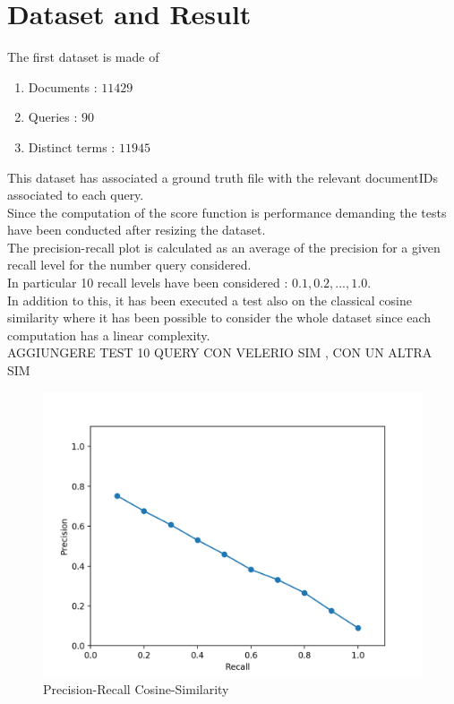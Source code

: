 \documentclass[twoside]{article}
\begin{document}
\section{Dataset and Result}
The first dataset is made of
\begin{enumerate}
\item Documents : $11429$
\item Queries : $90$
\item Distinct terms : $11945$
\end{enumerate}
This dataset has associated a ground truth file with the relevant documentIDs associated to each query.\\Since the computation of the score function is performance demanding the tests have been conducted after resizing the dataset.\\The precision-recall plot is calculated as an average of the precision for a given recall level for the number  query considered.\\In particular 10 recall levels have been considered : $ 0.1, 0.2, ... , 1.0 $.\\In addition to this, it has been executed a test also on the classical cosine similarity where it has been possible to consider the whole dataset since each computation has a linear complexity.\\AGGIUNGERE TEST 10 QUERY CON VELERIO SIM , CON UN ALTRA SIM
\begin{figure}[H]
\centering
        \includegraphics[totalheight=8cm]{cs.png}
    \caption{Precision-Recall Cosine-Similarity}
    \label{fig:plot1}
\end{figure}
\end{document}
